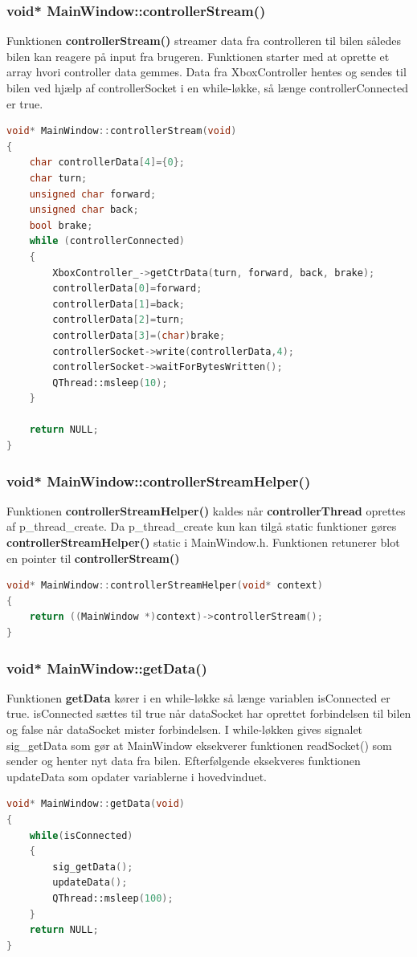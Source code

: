 \subsubsection{void* MainWindow::controllerStream()}
Funktionen \textbf{controllerStream()} streamer data fra controlleren til bilen således bilen kan reagere på input fra brugeren. Funktionen starter med at oprette et array hvori controller data gemmes. Data fra XboxController hentes og sendes til bilen ved hjælp af controllerSocket i en while-løkke, så længe controllerConnected er true.
\begin{lstlisting}[caption={controllerStream},label=lst:controller, language=c++]
void* MainWindow::controllerStream(void)
{
    char controllerData[4]={0};
    char turn;
    unsigned char forward;
    unsigned char back;
    bool brake;
    while (controllerConnected)
    {
        XboxController_->getCtrData(turn, forward, back, brake);
        controllerData[0]=forward;
        controllerData[1]=back;
        controllerData[2]=turn;
        controllerData[3]=(char)brake;
        controllerSocket->write(controllerData,4);
        controllerSocket->waitForBytesWritten();
        QThread::msleep(10);
    }

    return NULL;
}
\end{lstlisting}
\subsubsection{void* MainWindow::controllerStreamHelper()}
Funktionen \textbf{controllerStreamHelper()} kaldes når \textbf{controllerThread} oprettes af p\_thread\_create. Da p\_thread\_create kun kan tilgå static funktioner gøres \textbf{controllerStreamHelper()} static i MainWindow.h. Funktionen retunerer blot en pointer til \textbf{controllerStream()}
\begin{lstlisting}[caption={controllerStream},label=lst:controller, language=c++]
void* MainWindow::controllerStreamHelper(void* context)
{
    return ((MainWindow *)context)->controllerStream();
}
\end{lstlisting}

\subsubsection{void* MainWindow::getData()}
Funktionen \textbf{getData} kører i en while-løkke så længe variablen isConnected er true. isConnected sættes til true når dataSocket har oprettet forbindelsen til bilen og false når dataSocket mister forbindelsen. I while-løkken gives signalet sig\_getData som gør at MainWindow eksekverer funktionen readSocket() som sender og henter nyt data fra bilen. Efterfølgende eksekveres funktionen updateData som opdater variablerne i hovedvinduet.
\begin{lstlisting}[caption={getData},label=lst:getData, language=c++]
void* MainWindow::getData(void)
{
    while(isConnected)
    {
        sig_getData();
        updateData();
        QThread::msleep(100);
    }
    return NULL;
}
\end{lstlisting}
